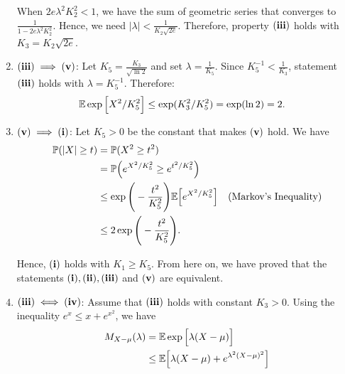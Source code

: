 \begin{proof*}
\begin{enumerate}
		\noindent When $2e\lambda^2K_2^2 < 1$, we have the sum of geometric series that converges to $\frac{1}{1 - 2e\lambda^2K_2^2}$. Hence, we need $|\lambda| < \frac{1}{K_2\sqrt{2e}}$. Therefore, property $\bf (iii)$ holds with $K_3 = K_2\sqrt{2e}$.

		\item ${\bf (iii)}\implies {\bf (v)}$: Let $K_5=\frac{K_3}{\sqrt{\ln 2}}$ and set $\lambda=\frac{1}{K_5}$. Since $K_5^{-1} < \frac{1}{K_3}$, statement $\bf (iii)$ holds with $\lambda=K_5^{-1}$. Therefore:
		\begin{align*}
			\mathbb{E}\exp\Big[ X^2/K_5^2 \Big] &\le \exp(K_3^2/K_5^2) = \exp(\ln 2) = 2.
		\end{align*} 

		\item ${\bf (v)}\implies{\bf (i)}$: Let $K_5>0$ be the constant that makes $\bf (v)$ hold. We have
		\begin{align*}
			\mathbb{P}(|X| \ge t) &= \mathbb{P}(X^2\ge t^2) \\
				&= \mathbb{P}\Big( e^{X^2/K_5^2} \ge e^{t^2/K_5^2} \Big) \\
				&\le \exp\Bigg( -\frac{t^2}{K_5^2} \Bigg)\mathbb{E}\Big[ e^{X^2/K_5^2} \Big] \quad \text{(Markov's Inequality)} \\
				&\le 2\exp\Bigg( -\frac{t^2}{K_5^2} \Bigg).
		\end{align*} 

		\noindent Hence, $\bf (i)$ holds with $K_1\ge K_5$. From here on, we have proved that the statements $\bf (i), (ii), (iii)$ and $\bf (v)$ are equivalent. 

		\item ${\bf (iii)} \iff {\bf (iv)}$: Assume that $\bf (iii)$ holds with constant $K_3>0$. Using the inequality $e^x\le x + e^{x^2}$, we have
		\begin{align*}
			M_{X-\mu}(\lambda) &= \mathbb{E}\exp\Big[ \lambda(X-\mu) \Big] \\
				&\le \mathbb{E}\Big[ \lambda(X-\mu) + e^{\lambda^2(X-\mu)^2} \Big]
		\end{align*} 
	\end{enumerate} 
\end{proof*} 
